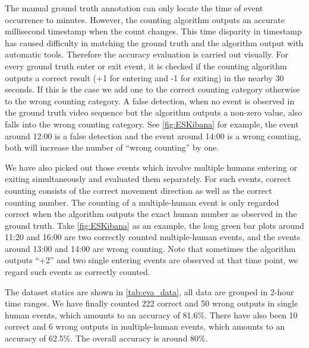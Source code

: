 The manual ground truth annotation can only locate the time of event occurrence to minutes. However, the counting algorithm outputs an accurate millisecond timestamp when the count changes. This time disparity in timestamp has caused difficulty in matching the ground truth and the algorithm output with automatic tools. Therefore the accuracy evaluation is carried out visually. For every ground truth enter or exit event, it is checked if the counting algorithm outputs a correct result (+1 for entering and -1 for exiting) in the nearby 30 seconds. If this is the case we add one to the correct counting category otherwise to the wrong counting category. A false detection, when no event is observed in the ground truth video sequence but the algorithm outputs a non-zero value, also falls into the wrong counting category. See \autoref{fig:ESKibana} for example, the event around 12:00 is a false detection and the event around 14:00 is a wrong counting, both will increase the number of ``wrong counting'' by one.

We have also picked out those events which involve multiple humans entering or exiting simultaneously and evaluated them separately. For such events, correct counting consists of the correct movement direction as well as the correct counting number. The counting of a multiple-human event is only regarded correct when the algorithm outputs the exact human number as observed in the ground truth. Take \autoref{fig:ESKibana} as an example, the long green bar plots around 11:20 and 16:00 are two correctly counted multiple-human events, and the events around 13:00 and 14:00 are wrong counting. Note that sometimes the algorithm outputs ``+2'' and two single entering events are observed at that time point, we regard such events as correctly counted.

The dataset statics are shown in \autoref{tab:eva_data}, all data are grouped in 2-hour time ranges. We have finally counted 222 correct and 50 wrong outputs in single human events, which amounts to an accuracy of 81.6\%. There have also been 10 correct and 6 wrong outputs in multiple-human events, which amounts to an accuracy of 62.5\%. The overall accuracy is around 80\%.

